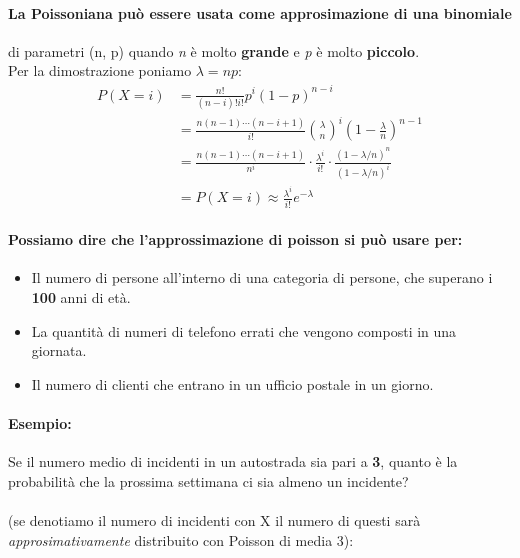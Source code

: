 \documentclass[]{article}
\begin{document}
    \paragraph{La Poissoniana può essere usata come approsimazione di una binomiale} di parametri (n, p) quando \textit{n} è molto \textbf{grande} 
    e \textit{p} è molto \textbf{piccolo}. \\
    Per la dimostrazione poniamo $\lambda = np$:
    \begin{equation*}
        \begin{split}
            P(X = i) &= \frac{n!}{(n-i)! i!} p^i (1-p)^{n-i} \\
            & = \frac{n(n-1) \cdots (n-i+1)}{i!} \binom{\lambda}{n}^i (1 - \frac{\lambda}{n})^{n-1} \\
            & = \frac{n(n-1) \cdots (n-i+1)}{n^i} \cdot \frac{\lambda^i}{i!} \cdot \frac{(1 - \lambda / n)^n}{(1 - \lambda/n)^i} \\
            & = P(X = i) \approx \frac{\lambda^i}{i!} e^{-\lambda}
        \end{split}
    \end{equation*}

    \paragraph{Possiamo dire che l'approssimazione di poisson si può usare per:}
    \begin{itemize}
        \item Il numero di persone all'interno di una categoria di persone, che superano i \textbf{100} anni di età.
        \item La quantità di numeri di telefono errati che vengono composti in una giornata.
        \item Il numero di clienti che entrano in un ufficio postale in un giorno.
    \end{itemize}

    \paragraph{Esempio:} Se il numero medio di incidenti in un autostrada sia pari a \textbf{3}, quanto è la probabilità
    che la prossima settimana ci sia almeno un incidente? \\ \\
    (se denotiamo il numero di incidenti con X il numero di questi sarà \textit{approsimativamente} distribuito con Poisson di media 3):
    
\end{document}
